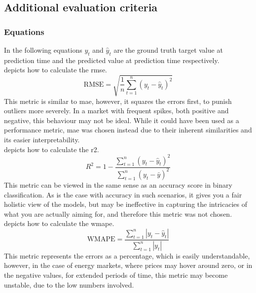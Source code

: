 \subsection{Additional evaluation criteria}\label{app:A}
\subsubsection*{Equations}\label{app:A:equations}
In the following equations $y_t$ and $\hat{y}_t$ are the ground truth target 
value at prediction time and the predicted value at prediction time 
respectively. \\
 depicts how to calculate the \gls{rmse}.
\begin{equation}
	\text{RMSE} = \sqrt{\frac{1}{n} \sum_{t=1}^{n} (y_t - \hat{y}_t)^2}
	\label{eq:rmse}
\end{equation}
This metric is similar to \gls{mae}, however, it squares the errors first, to 
punish outliers more severely. In a market with frequent spikes, both positive 
and negative, this behaviour may not be ideal. While it could have been used as 
a performance metric, \gls{mae} was chosen instead due to their inherent 
similarities and its easier interpretability. \\

 depicts how to calculate the \gls{r2}.
\begin{equation}
	R^2 = 1 - \frac{\sum_{t=1}^{n} (y_t - \hat{y}_t)^2}{\sum_{t=1}^{n} (y_t - 
		\bar{y})^2}
	\label{eq:r2}
\end{equation}
This metric can be viewed in the same sense as an accuracy score in binary 
classification. As is the case with accuracy in such scenarios, it gives you a 
fair holistic view of the models, but may be ineffective in capturing the 
intricacies of what you are actually aiming for, and therefore this metric was 
not chosen. \\

 depicts how to calculate the \gls{wmape}.
\begin{equation}
	\text{WMAPE} = \frac{\sum_{t=1}^{n} |y_t - \hat{y}_t|}{\sum_{t=1}^{n} |y_t|}
	\label{eq:wmape}
\end{equation}
This metric represents the errors as a percentage, which is easily 
understandable, however, in the case of energy markets, where prices may hover 
around zero, or in the negative values, for extended periods of time, this 
metric may become unstable, due to the low numbers involved. \\

